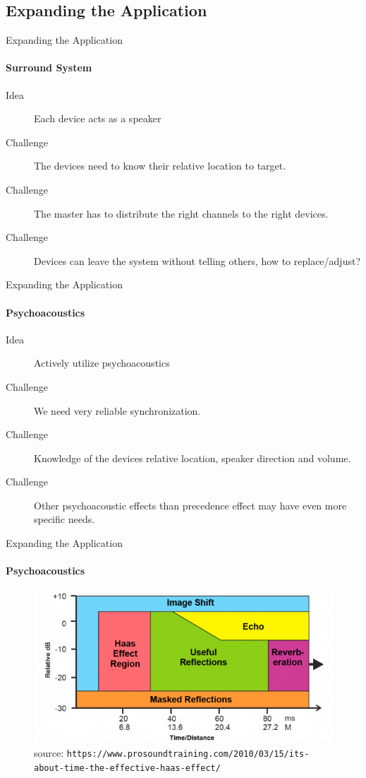 \subsection{Expanding the Application}
\begin{frame}{Expanding the Application}
    \framesubtitle{Surround System}
    \begin{description}
        \item [Idea] Each device acts as a speaker
        \item [Challenge] The devices need to know their relative location to target.
        \item [Challenge] The master has to distribute the right channels to the right devices.
        \item [Challenge] Devices can leave the system without telling others, how to replace/adjust?
    \end{description}
\end{frame}

\begin{frame}{Expanding the Application}
    \framesubtitle{Psychoacoustics}
    \begin{description}
        \item [Idea] Actively utilize psychoacoustics %
        \item [Challenge] We need very reliable synchronization.
        \item [Challenge] Knowledge of the devices relative location, speaker direction and volume.
        \item [Challenge] Other psychoacoustic effects than precedence effect may have even more specific needs.
    \end{description}
\end{frame}

\begin{frame}{Expanding the Application}
    \framesubtitle{Psychoacoustics}
    \begin{figure}
    \centering
    \includegraphics[height=0.5\textheight]{images/haas.png}
    \caption{source: \texttt{https://www.prosoundtraining.com/2010/03/15/its-about-time-the-effective-haas-effect/}}
    \end{figure}
\end{frame}
